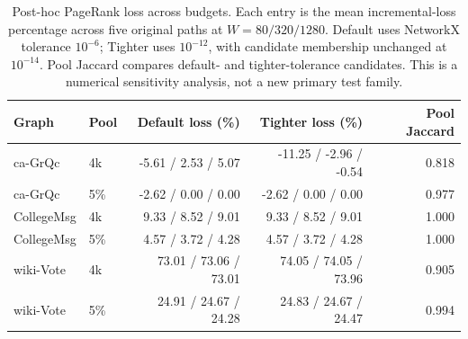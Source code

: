 \begin{table}[htbp]
\caption{Post-hoc PageRank loss across budgets. Each entry is the mean incremental-loss percentage across five original paths at $W=80/320/1280$. Default uses NetworkX tolerance $10^{-6}$; Tighter uses $10^{-12}$, with candidate membership unchanged at $10^{-14}$. Pool Jaccard compares default- and tighter-tolerance candidates. This is a numerical sensitivity analysis, not a new primary test family.}\label{tab:precision-budget}
\begin{tabular}{llrrr}
\toprule
Graph & Pool & Default loss (\%) & Tighter loss (\%) & Pool Jaccard \\
\midrule
ca-GrQc & 4k & -5.61 / 2.53 / 5.07 & -11.25 / -2.96 / -0.54 & 0.818 \\
ca-GrQc & 5\% & -2.62 / 0.00 / 0.00 & -2.62 / 0.00 / 0.00 & 0.977 \\
CollegeMsg & 4k & 9.33 / 8.52 / 9.01 & 9.33 / 8.52 / 9.01 & 1.000 \\
CollegeMsg & 5\% & 4.57 / 3.72 / 4.28 & 4.57 / 3.72 / 4.28 & 1.000 \\
wiki-Vote & 4k & 73.01 / 73.06 / 73.01 & 74.05 / 74.05 / 73.96 & 0.905 \\
wiki-Vote & 5\% & 24.91 / 24.67 / 24.28 & 24.83 / 24.67 / 24.47 & 0.994 \\
\bottomrule
\end{tabular}
\end{table}
